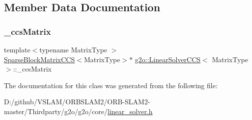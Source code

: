 \subsection{Member Data Documentation}
\mbox{\label{classg2o_1_1_linear_solver_c_c_s_a07f0df9a6012d567e26a89063c53aa12}} 
\subsubsection{\texorpdfstring{\+\_\+ccs\+Matrix}{\_ccsMatrix}}
{\footnotesize\ttfamily template$<$typename Matrix\+Type $>$ \\
\mbox{\hyperlink{classg2o_1_1_sparse_block_matrix_c_c_s}{Sparse\+Block\+Matrix\+C\+CS}}$<$Matrix\+Type$>$$\ast$ \mbox{\hyperlink{classg2o_1_1_linear_solver_c_c_s}{g2o\+::\+Linear\+Solver\+C\+CS}}$<$ Matrix\+Type $>$\+::\+\_\+ccs\+Matrix\hspace{0.3cm}{\ttfamily [protected]}}



The documentation for this class was generated from the following file\+:\begin{DoxyCompactItemize}
\item 
D\+:/github/\+V\+S\+L\+A\+M/\+O\+R\+B\+S\+L\+A\+M2/\+O\+R\+B-\/\+S\+L\+A\+M2-\/master/\+Thirdparty/g2o/g2o/core/\mbox{\hyperlink{linear__solver_8h}{linear\+\_\+solver.\+h}}\end{DoxyCompactItemize}
